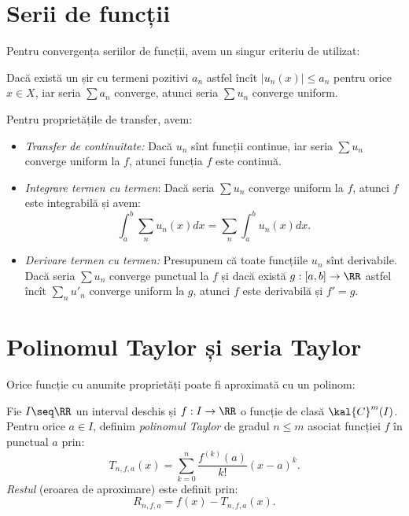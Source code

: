 
\section{Serii de funcții}

Pentru convergența seriilor de funcții, avem un singur criteriu de utilizat:
\begin{theorem}[Weierstrass]\label{thm:wei-serii-f}
  Dacă există un șir cu termeni pozitivi $ a_n $ astfel încît $ |u_n(x)| \leq a_n $
  pentru orice $ x \in X $, iar seria $ \sum a_n $ converge, atunci seria
  $ \sum u_n $ converge uniform.
\end{theorem}

Pentru proprietățile de transfer, avem:
\begin{theorem}\label{thm:transfer}
  \begin{itemize}
  \item \emph{Transfer de continuitate:} Dacă $ u_n $ sînt funcții continue,
    iar seria $ \sum u_n $ converge uniform la $ f $, atunci funcția $ f $
    este continuă.
  \item \emph{Integrare termen cu termen}: Dacă seria $ \sum u_n $ converge
    uniform la $ f $, atunci $ f $ este integrabilă și avem:
    \[
      \int_a^b \sum_n u_n(x) dx = \sum_n \int_a^b u_n(x) dx.
    \]
  \item \emph{Derivare termen cu termen:} Presupunem că toate funcțiile $ u_n $
    sînt derivabile. Dacă seria $ \sum u_n $ converge punctual la $ f $ și
    dacă există $ g : [a,b] \to \RR $ astfel încît $ \sum_n u'_n $
    converge uniform la $ g $, atunci $ f $ este derivabilă și $ f' = g $.
  \end{itemize}
\end{theorem}


\section{Polinomul Taylor și seria Taylor}

Orice funcție cu anumite proprietăți poate fi aproximată cu un polinom:

\begin{definition}\label{def:pol-taylor}
  Fie $ I \seq \RR $ un interval deschis și $ f: I \to \RR $ o funcție de clasă
  $ \kal{C}^m(I) $. Pentru orice $ a \in I $, definim \emph{polinomul Taylor}
  de gradul $ n \leq m $ asociat funcției $ f $ în punctual $ a $ prin:
  \[
    T_{n,f,a}(x) = \sum_{k = 0}^n \frac{f^{(k)}(a)}{k!} (x - a)^k.
  \]
  \emph{Restul} (eroarea de aproximare) este definit prin:
  \[
    R_{n,f,a} = f(x) - T_{n,f,a}(x).
  \]
\end{definition}

